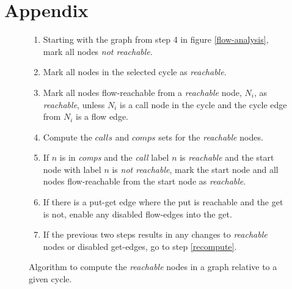 \documentclass[12pt]{article}%
\begin{document}
\section{Appendix}

\begin{figure}
\begin{shaded}
\begin{enumerate}
\item Starting with the graph from step 4 in figure \ref{flow-analysis}, mark all nodes \emph{not reachable}.
\item Mark all nodes in the selected cycle as \emph{reachable}. 
\item Mark all nodes flow-reachable from a \emph{reachable} node, $N_i$, as \emph{reachable}, unless $N_i$ is a call node in the cycle and
the cycle edge from $N_i$ is a flow edge.
\item \label{recompute} Compute the $calls$ and $comps$ sets for the \emph{reachable} nodes.
\item If ${n}$ is in \emph{comps} and the \emph{call} label ${n}$ is \emph{reachable} and the start node with label ${n}$ is
\emph{not reachable}, mark the start node and all nodes flow-reachable from the start node as \emph{reachable}.

\item If there is a put-get edge where the put is reachable and the get is not,
enable any disabled flow-edges into the get. %

\item If the previous two steps results in any changes to \emph{reachable} nodes or disabled get-edges, go to step \ref{recompute}.
\end{enumerate}
\end{shaded}
\caption{\label{reachable-analysis}
Algorithm to compute the \emph{reachable} nodes in a graph relative to a given cycle.}
\end{figure}
\end{document}
